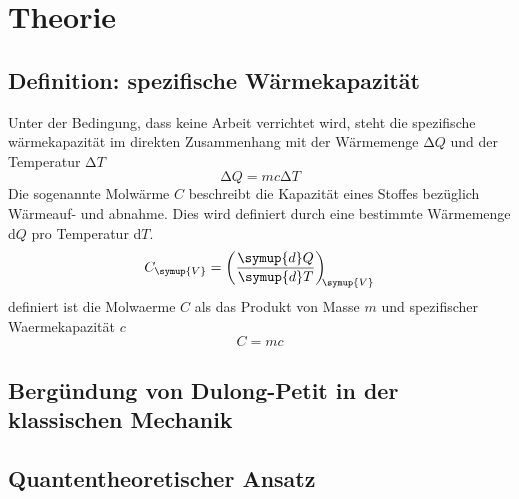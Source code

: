 \section{Theorie}
\label{sec:Theorie}
\subsection{Definition: spezifische Wärmekapazität}
Unter der Bedingung, dass keine Arbeit verrichtet wird, steht die spezifische
wärmekapazität im direkten Zusammenhang mit der Wärmemenge $\increment Q$ und
der Temperatur $\increment T$
\begin{equation}
  \increment Q = mc\increment T
\end{equation}
Die sogenannte Molwärme $C$ beschreibt die Kapazität eines Stoffes bezüglich
Wärmeauf- und abnahme. Dies wird definiert durch eine bestimmte Wärmemenge
d$Q$ pro Temperatur d$T$.
\begin{equation}
  C_\symup{V} = \left(\frac{\symup{d}Q}{\symup{d}T}\right)_{\!\!\symup{V}}
\end{equation}
definiert ist die Molwaerme $C$ als das Produkt von Masse $m$ und spezifischer
Waermekapazität $c$
\begin{equation}
  C = mc
\end{equation}
\subsection{Bergündung von Dulong-Petit in der klassischen Mechanik}
\subsection{Quantentheoretischer Ansatz}
